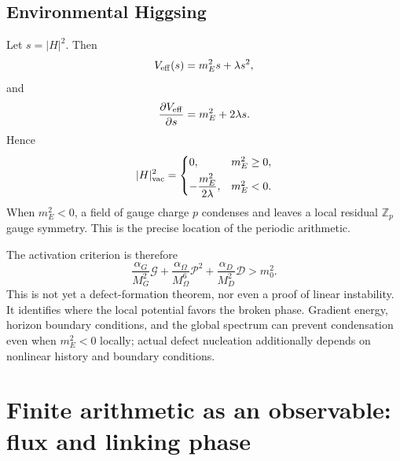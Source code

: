 \documentclass[11pt]{article}
\newcommand{\Geff}{\mathcal G}
\newcommand{\Ddark}{\mathcal D}
\newcommand{\Pontryagin}{\mathcal P}
\begin{document}
\subsection{Environmental Higgsing}

Let $s=|H|^2$.  Then
\begin{equation}
V_{\rm eff}(s)=m_E^2 s+\lambda s^2,
\end{equation}
and
\begin{equation}
\frac{\partial V_{\rm eff}}{\partial s}=m_E^2+2\lambda s.
\end{equation}
Hence
\begin{equation}
|H|^2_{\rm vac}=
\begin{cases}
0, & m_E^2\ge0,\\[1mm]
-\dfrac{m_E^2}{2\lambda}, & m_E^2<0.
\end{cases}
\label{eq:vev}
\end{equation}
When $m_E^2<0$, a field of gauge charge $p$ condenses and leaves a local residual $\mathbb Z_p$ gauge symmetry.  This is the precise location of the periodic arithmetic.

The activation criterion is therefore
\begin{equation}
\boxed{
\frac{\alpha_G}{M_G^2}\Geff
+\frac{\alpha_\Omega}{M_\Omega^6}\Pontryagin^2
+\frac{\alpha_D}{M_D^2}\Ddark
>m_0^2.
}
\label{eq:activation}
\end{equation}
This is not yet a defect-formation theorem, nor even a proof of linear instability.  It identifies where the local potential favors the broken phase.  Gradient energy, horizon boundary conditions, and the global spectrum can prevent condensation even when $m_E^2<0$ locally; actual defect nucleation additionally depends on nonlinear history and boundary conditions.

\section{Finite arithmetic as an observable: flux and linking phase}
\end{document}
